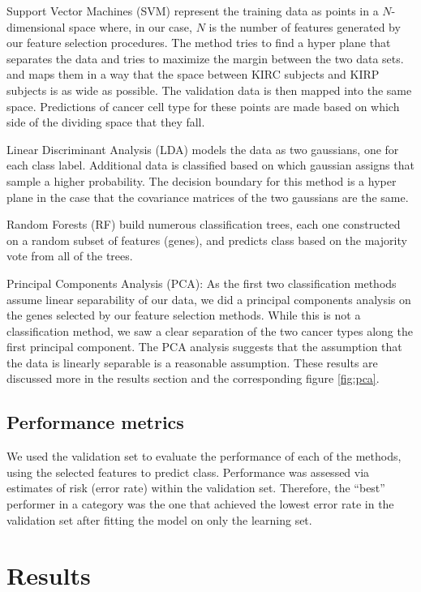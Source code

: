 Support Vector Machines (SVM) represent the training data as points in a 
$N$-dimensional space where, in our case, $N$ is the number of features 
generated by our feature selection procedures. The method tries to find a hyper plane that separates the data and tries to maximize the margin between the two data sets. and maps them in a way that the space between KIRC subjects and KIRP subjects
is as wide as possible. The validation data is then mapped into the same space.
Predictions of cancer cell type for these points are made based on which side
of the dividing space that they fall. 

Linear Discriminant Analysis (LDA) models the data as two gaussians, one for each class label. Additional data is classified based on which gaussian assigns that sample a higher probability. The decision boundary for this method is a hyper plane in the case that the covariance matrices of the two gaussians are the same. 

Random Forests (RF) build numerous classification trees, each one constructed
on a random subset of features (genes), and predicts class based on the
majority vote from all of the trees.

Principal Components Analysis (PCA): As the first two classification methods assume linear separability of our data, we did a principal components analysis on the genes selected by our feature selection methods.  While this is not a classification method, we saw a clear separation of the two cancer types along the first principal component. The PCA analysis suggests that the assumption that the data is linearly separable is a reasonable assumption. These results are discussed more in the results section and the corresponding figure \ref{fig:pca}. 

\subsection*{Performance metrics}

We used the validation set to evaluate the performance of each of the methods,
using the selected features to predict class. Performance was assessed via
estimates of risk (error rate) within the validation set. Therefore, the
``best'' performer in a category was the one that achieved the lowest error
rate in the validation set after fitting the model on only the learning set.

\section{Results}

